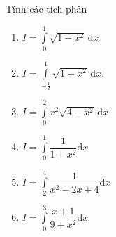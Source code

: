 \begin{bt}
\begin{enumerate}
	\end{enumerate}
\end{bt}
\begin{bt}%
	Tính các tích phân
	\begin{enumerate}
		\item  $I=\displaystyle\int\limits_0^1\sqrt{1-x^2} \mathrm{\,d}x$. 
		\item   $I=\displaystyle\int\limits_{-\frac{1}{2}}^1\sqrt{1-x^2}\mathrm{\,d}x$.	
		\item  $I=\displaystyle\int\limits_0^2 x^2\sqrt{4-x^2}\mathrm{\,d}x$ \dapso{$\pi$}
		\item $I=\displaystyle \int \limits_{0}^{1} \dfrac{1}{1+x^2} \mathrm{d}x$ 
		\item $I= \displaystyle \int \limits_2^{4} \dfrac{1}{x^2-2x+4} \mathrm{d} x$ 
		
		\item $I=\displaystyle \int \limits_{0}^{3} \dfrac{x+1}{9+x^2} \mathrm{d}x$ 
	\end{enumerate}


\end{bt}
